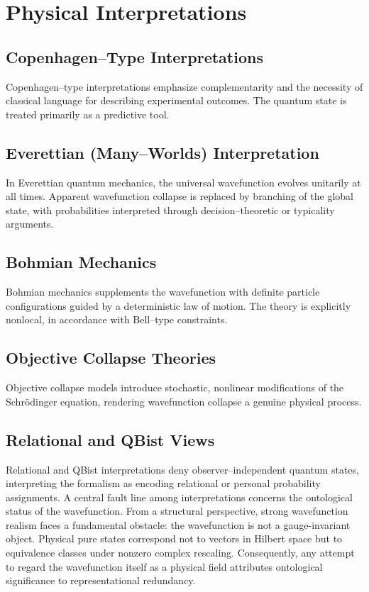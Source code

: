 \documentclass[11pt]{article}
\begin{document}
\section{Physical Interpretations}

\subsection{Copenhagen--Type Interpretations}

Copenhagen--type interpretations emphasize complementarity and the necessity of classical language for describing experimental outcomes. The quantum state is treated primarily as a predictive tool.

\subsection{Everettian (Many--Worlds) Interpretation}

In Everettian quantum mechanics, the universal wavefunction evolves unitarily at all times. Apparent wavefunction collapse is replaced by branching of the global state, with probabilities interpreted through decision--theoretic or typicality arguments.

\subsection{Bohmian Mechanics}

Bohmian mechanics supplements the wavefunction with definite particle configurations guided by a deterministic law of motion. The theory is explicitly nonlocal, in accordance with Bell--type constraints.

\subsection{Objective Collapse Theories}

Objective collapse models introduce stochastic, nonlinear modifications of the Schrödinger equation, rendering wavefunction collapse a genuine physical process.

\subsection{Relational and QBist Views}

Relational and QBist interpretations deny observer--independent quantum states, interpreting the formalism as encoding relational or personal probability assignments.
A central fault line among interpretations concerns the ontological status of the wavefunction. From a structural perspective, strong wavefunction realism faces a fundamental obstacle: the wavefunction is not a gauge-invariant object. Physical pure states correspond not to vectors in Hilbert space but to equivalence classes under nonzero complex rescaling. Consequently, any attempt to regard the wavefunction itself as a physical field attributes ontological significance to representational redundancy.
\end{document}
